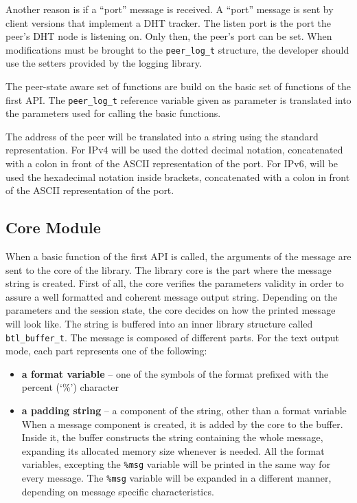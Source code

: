 Another reason is if a ``port'' message is received. A ``port'' message is
sent by client versions that implement a DHT tracker. The listen port is the
port the peer's DHT node is listening on. Only then, the peer's port can be
set. When modifications must be brought to the \texttt{peer\_log\_t}
structure, the developer should use the setters provided by the logging
library.

The peer-state aware set of functions are build on the basic set of functions
of the first API. The \texttt{peer\_log\_t} reference variable given as
parameter is translated into the parameters used for calling the basic
functions.

The address of the peer will be translated into a string using the standard
representation. For IPv4 will be used the dotted decimal notation,
concatenated with a colon in front of the ASCII representation of the port.
For IPv6, will be used the hexadecimal notation inside brackets, concatenated
with a colon in front of the ASCII representation of the port.

\subsection{Core Module}

When a basic function of the first API is called, the arguments of the message
are sent to the core of the library. The library core is the part where the
message string is created. First of all, the core verifies the parameters
validity in order to assure a well formatted  and coherent message output
string. Depending on the parameters and the session state, the core decides on
how the printed message will look like. The string is buffered into an inner
library structure called \texttt{btl\_buffer\_t}. The message is composed of
different parts. For the text output mode, each part represents one of the
following:

\begin{itemize}
  \item \textbf{a format variable} -- one of the symbols of the format
  prefixed with the percent (`\%') character
  \item \textbf{a padding string} -- a component of the string, other than a
  format variable When a message component is created, it is added by the core
  to the buffer. Inside it, the buffer constructs the string containing the
  whole message, expanding its allocated memory size whenever is needed. All
  the format variables, excepting the \texttt{\%msg} variable will be printed
  in the same way for every message. The \texttt{\%msg} variable will be
  expanded in a different manner, depending on message specific
  characteristics.
\end{itemize}

